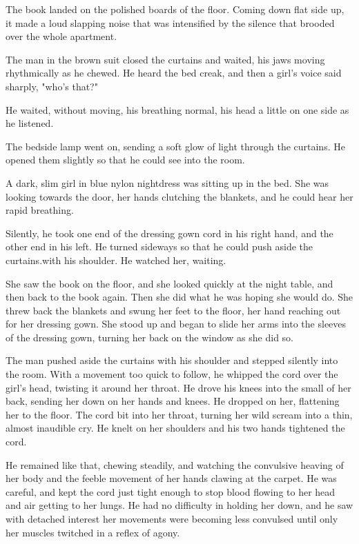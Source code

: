 \documentclass{novel}
\begin{document}
The book landed on the polished boards of the floor. Coming down flat side up, it made a loud slapping noise that was intensified by the silence that brooded over the whole apartment.

The man in the brown suit closed the curtains and waited, his jaws moving rhythmically as he chewed. He heard the bed creak, and then a girl's voice said sharply, "who's that?"

He waited, without moving, his breathing normal, his head a little on one side as he listened.

The bedside lamp went on, sending a soft glow of light through the curtains. He opened them slightly so that he could see into the room.

A dark, slim girl in blue nylon nightdress was sitting up in the bed. She was looking towards the door, her hands clutching the blankets, and he could hear her rapid breathing.

Silently, he took one end of the dressing gown cord in his right hand, and the other end in his left. He turned sideways so that he could push aside the curtains.with his shoulder. He watched her, waiting.

She saw the book on the floor, and she looked quickly at the night table, and then back to the book again. Then she did what he was hoping she would do. She threw back the blankets and swung her feet to the floor, her hand reaching out for her dressing gown. She stood up and began to slide her arms into the sleeves of the dressing gown, turning her back on the window as she did so.

The man pushed aside the curtains with his shoulder and stepped silently into the room. With a movement too quick to follow, he whipped the cord over the girl's head, twisting it around her throat. He drove his knees into the small of her back, sending her down on her hands and knees. He dropped on her, flattening her to the floor. The cord bit into her throat, turning her wild scream into a thin, almost inaudible cry. He knelt on her shoulders and his two hands tightened the cord.

He remained like that, chewing steadily, and watching the convulsive heaving of her body and the feeble movement of her hands clawing at the carpet. He was careful, and kept the cord just tight enough to stop blood flowing to her head and air getting to her lungs. He had no difficulty in holding her down, and he saw with detached interest her movements were becoming less convulsed until only her muscles twitched in a reflex of agony.
\end{document}
